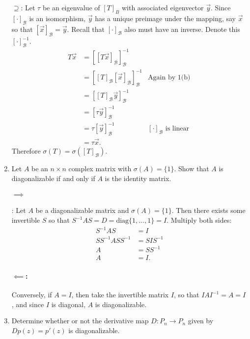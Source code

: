 \documentclass{article}
\begin{document}
\begin{enumerate}
    $\supseteq$: Let $\tau$ be an eigenvalue of $[T]_B$ with associated eigenvector  $\vec{y}$. Since  $[\cdot ]_\mathcal{B}$ is an isomorphism, $\vec{y}$ has a unique preimage under the mapping, say $\vec{x}$ so that $[\vec{x}]_\mathcal{B}=\vec{y}$. Recall that $[\cdot ]_\mathcal{B}$ also must have an inverse. Denote this $[\cdot ]^{-1}_\mathcal{B}$. %
    \begin{align*}
        T\vec{x}&=[[T\vec{x} ]_\mathcal{B}]^{-1}_\mathcal{B}\\
                &= [[T]_\mathcal{B}[\vec{x}]_\mathcal{B}]_\mathcal{B}^{-1}&\text{Again by 1(b)} \\
                &=  [[T]_\mathcal{B}\vec{y}]_\mathcal{B}^{-1}\\
                &= [\tau\vec{y}]_\mathcal{B}^{-1} \\
                &= \tau[\vec{y}]_\mathcal{B}^{-1} &[\cdot ]_\mathcal{B} \text{ is linear }\\
                &= \tau\vec{x} 
    .\end{align*}
    Therefore $\sigma(T)=\sigma([T]_\mathcal{B})$.
\item Let $A$ be an $n \times n$ complex matrix with $\sigma(A) = \{1\}$. Show that $A$ is diagonalizable if and only if $A$ is the identity matrix.
    \paragraph{$\implies$}: Let $A$ be a diagonalizable matrix and $\sigma(A)=\{1\} $. Then there exists some invertible $S$ so that $S^{-1}AS=D=\text{diag}\{1,\ldots,1\}=I$. Multiply both sides:
    \begin{align*}
        S^{-1}AS&= I \\
        SS^{-1}ASS^{-1}&=SIS^{-1}\\
        A&=SS^{-1}\\
        A&= I
    .\end{align*}

    \paragraph{$\impliedby$:} Conversely, if $A=I$, then take the invertible matrix $I$, so that $IAI^{-1}=A=I$, and since $I$ is diagonal, $A$ is diagonalizable. 

\item Determine whether or not the derivative map $D : P_n \rightarrow P_n$ given by $Dp(z) = p'(z)$ is diagonalizable.

\end{enumerate}
\end{document}
